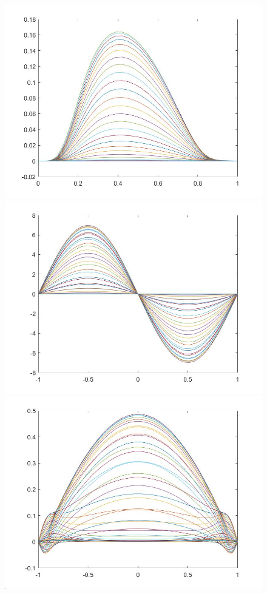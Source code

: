\documentclass[11pt, a4paper]{article}
\theoremstyle{definition}
\begin{document}
\begin{figure}[h]
	\includegraphics[scale=0.3]{Dexperr3.jpg}
	\includegraphics[scale=0.3]{Dexperr4.jpg}
	\includegraphics[scale=0.3]{Dexperr5.jpg}

\end{figure}
\end{document}
